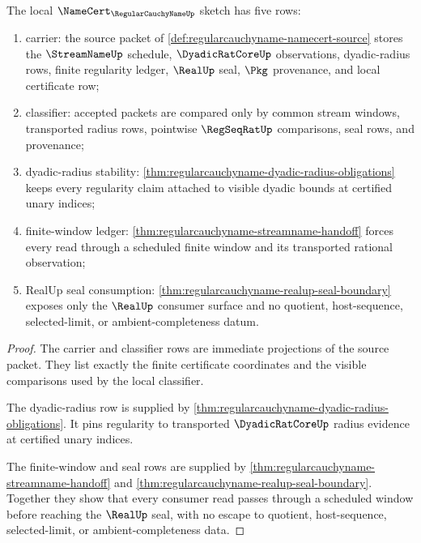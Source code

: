 \begin{theorem}
\label{thm:regularcauchyname-namecert-obligation-surface}
The local $\NameCert_{\RegularCauchyNameUp}$ sketch has five rows:
\begin{enumerate}
\item carrier: the source packet of \autoref{def:regularcauchyname-namecert-source} stores the $\StreamNameUp$ schedule, $\DyadicRatCoreUp$ observations, dyadic-radius rows, finite regularity ledger, $\RealUp$ seal, $\Pkg$ provenance, and local certificate row;
\item classifier: accepted packets are compared only by common stream windows, transported radius rows, pointwise $\RegSeqRatUp$ comparisons, seal rows, and provenance;
\item dyadic-radius stability: \autoref{thm:regularcauchyname-dyadic-radius-obligations} keeps every regularity claim attached to visible dyadic bounds at certified unary indices;
\item finite-window ledger: \autoref{thm:regularcauchyname-streamname-handoff} forces every read through a scheduled finite window and its transported rational observation;
\item RealUp seal consumption: \autoref{thm:regularcauchyname-realup-seal-boundary} exposes only the $\RealUp$ consumer surface and no quotient, host-sequence, selected-limit, or ambient-completeness datum.
\end{enumerate}
\end{theorem}
\begin{proof}
The carrier and classifier rows are immediate projections of the source packet. They list exactly the finite certificate coordinates and the visible comparisons used by the local classifier.

The dyadic-radius row is supplied by \autoref{thm:regularcauchyname-dyadic-radius-obligations}. It pins regularity to transported $\DyadicRatCoreUp$ radius evidence at certified unary indices.

The finite-window and seal rows are supplied by \autoref{thm:regularcauchyname-streamname-handoff} and \autoref{thm:regularcauchyname-realup-seal-boundary}. Together they show that every consumer read passes through a scheduled window before reaching the $\RealUp$ seal, with no escape to quotient, host-sequence, selected-limit, or ambient-completeness data.
\end{proof}


